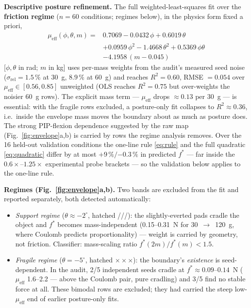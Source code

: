 \documentclass[journal]{IEEEtran}
\newcommand{\mueff}{\mu_{\mathrm{eff}}}
\newcommand{\fstar}{f^{*}}
\begin{document}
\textbf{Descriptive posture refinement.} The full weighted-least-squares
fit over the \textbf{friction regime} ($n = 60$ conditions; regimes below),
in the physics form fixed a priori,
\begin{equation}
\begin{aligned}
  \mueff(\phi,\theta,m) ={}& 0.7069 - 0.0432\,\phi + 0.6019\,\theta \\
  & + 0.0959\,\phi^2 - 1.4668\,\theta^2 + 0.5369\,\phi\theta \\
  & - 4.1958\,(m - 0.045)
  \label{eq:quadratic}
\end{aligned}
\end{equation}
[$\phi,\theta$ in rad; $m$ in kg] uses per-mass weights from the audit's
measured seed noise ($\sigma_{\mathrm{rel}} = 1.5\,\%$ at 30~g, $8.9\,\%$
at 60~g) and reaches $R^2 = 0.60$, RMSE $= 0.054$ over
$\mueff \in [0.56, 0.85]$ unweighted (OLS reaches $R^2 = 0.75$ but
over-weights the noisier 60~g rows). The explicit mass term --- $\mueff$
drops ${\approx}0.13$ per 30~g --- is essential: with the fragile rows
excluded, a posture-only fit collapses to $R^2 \approx 0.36$, i.e.\ inside
the envelope mass moves the boundary about as much as posture does. The
strong PIP-flexion dependence suggested by the raw map
(Fig.~\ref{fig:envelope}a,b) is carried by rows the regime analysis
removes. Over the 16 held-out validation conditions the one-line rule
\eqref{eq:rule} and the full quadratic \eqref{eq:quadratic} differ by at
most $+9\,\%/{-0.3}\,\%$ in predicted $\fstar$ --- far inside the
$0.6\times$--$1.25\times$ experimental probe brackets --- so the validation
below applies to the one-line rule.

\textbf{Regimes (Fig.~\ref{fig:envelope}a,b).} Two bands are excluded from
the fit and reported separately, both detected automatically:
\begin{itemize}
  \item \emph{Support regime} ($\theta \approx -2^\circ$, hatched ///):
    the slightly-everted pads cradle the object and $\fstar$ becomes
    mass-independent (0.15--0.31~N for 30~$\to$~120~g, where Coulomb
    predicts proportionality) --- weight is carried by geometry, not
    friction. Classifier: mass-scaling ratio $\fstar(2m)/\fstar(m) < 1.5$.
  \item \emph{Fragile regime} ($\theta = -5^\circ$, hatched
    $\times\times\times$): the boundary's \emph{existence} is
    seed-dependent. In the audit, 2/5 independent seeds cradle at
    $\fstar \approx 0.09$--$0.14$~N ($\mueff$ 1.6--2.2 --- above the
    Coulomb pair, pure cradling) and 3/5 find no stable force at all. These
    bimodal rows are excluded; they had carried the steep low-$\mueff$ end
    of earlier posture-only fits.
\end{itemize}
\end{document}
